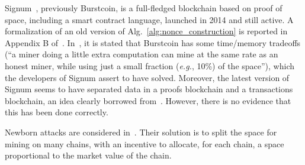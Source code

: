 Signum~\cite{Signum}, previously Burstcoin, is
a full-fledged blockchain based on proof of space, including a smart contract language,
launched in 2014 and still active.
A formalization of an old version of Alg.~\ref{alg:nonce_construction}
is reported in Appendix B of~\cite{ParkPAFG15}.
In~\cite{ParkKFGAP18}, it is stated that Burstcoin has some
time/memory tradeoffs (``a miner doing a little extra computation can mine at the same
rate as an honest miner, while using just a small fraction (\emph{e.g.}, 10\%) of the space''),
which the developers of Signum assert to have solved. Moreover, the latest version of Signum
seems to have separated data in a proofs blockchain and a transactions blockchain,
an idea clearly borrowed from~\cite{ParkKFGAP18}. However, there is no evidence that this
has been done correctly.

Newborn attacks are considered in~\cite{TangZDWLG0L19}. Their solution is
to split the space for mining on many chains, with an
incentive to allocate, for each chain, a space proportional
to the market value of the chain.
